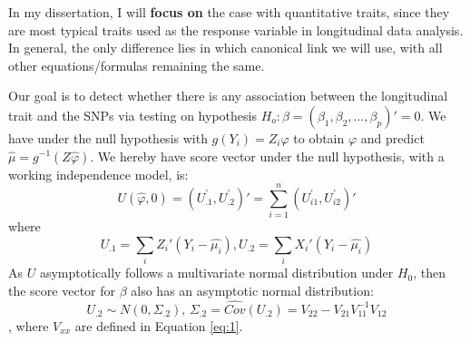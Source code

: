 \documentclass[compress]{beamer}
\begin{document}
{\framebreak
In my dissertation, I will \textbf{focus on} the case with quantitative traits, since they are most typical traits used as the response variable in longitudinal data analysis. In general, the only difference lies in which canonical link we will use, with all other equations/formulas remaining the same.


\framebreak
\footnotesize
Our goal is to detect whether there is any association between the longitudinal trait and the SNPs via testing on hypothesis $H_{o}:\beta=(\beta_{1},\beta_{2},\ldots,\beta_{p})'=0$. We have under the null hypothesis with $g(Y_i)=Z_i\varphi$ to obtain $\varphi$ and predict $\hat{\mu}=g^{-1}(Z\hat{\varphi})$. We hereby have score vector under the null hypothesis, with a working independence model, is:
$$U(\hat{\varphi},0)=(U_{.1}^{'}, U_{.2}^{'})'=\sum_{i=1}^{n}(U_{i1}^{'},U_{i2}^{'})'$$
where
$$U_{.1}=\sum_{i}Z_{i}'(Y_{i}-\hat{\mu_{i}}), U_{.2}=\sum_{i}X_{i}'(Y_{i}-\hat{\mu_{i}})$$ 
As $U$ asymptotically follows a multivariate normal distribution under $H_{0}$, then the score vector for $\beta$ also has an asymptotic normal distribution:\\
$$
U_{.2}\sim N(0,\Sigma_{.2}),\,\Sigma_{.2}= \widehat{Cov} (U_{.2}) = V_{22} - V_{21} V_{11}^{-1} V_{12}
$$, where $V_{xx}$ are defined in Equation \ref{eq:1}.

}
\end{document}
